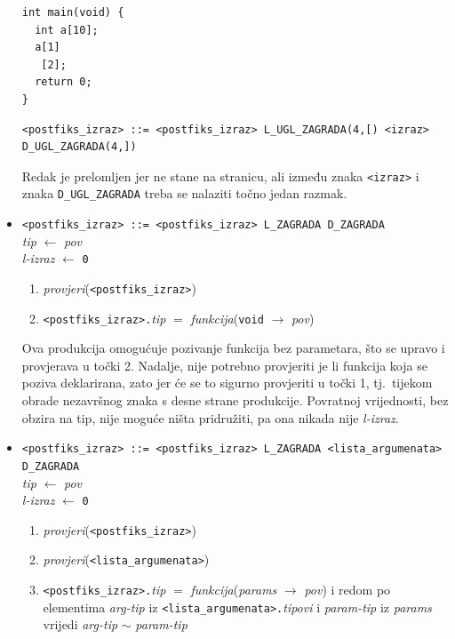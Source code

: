 \documentclass[times, 12pt, utf8]{book}
\begin{document}
\begin{itemize}
\begin{lstlisting}[caption={Program sa semantičkom pogreškom višestrukog indeksiranja niza.},label=lst:primjer_dvostruko_indeksiranje_in]
int main(void) {
  int a[10];
  a[1]
   [2];
  return 0;
}
\end{lstlisting}

\begin{lstlisting}[caption={Ispis semantičkog analizatora za generativno stablo programa \ref{lst:primjer_dvostruko_indeksiranje_in}.},label=lst:primjer_dvostruko_indeksiranje_out]
<postfiks_izraz> ::= <postfiks_izraz> L_UGL_ZAGRADA(4,[) <izraz> D_UGL_ZAGRADA(4,])

\end{lstlisting}

Redak je prelomljen jer ne stane na stranicu, ali između znaka \verb|<izraz>| i znaka \verb|D_UGL_ZAGRADA| treba se nalaziti točno jedan razmak.

\item
\verb|<postfiks_izraz> ::= <postfiks_izraz> L_ZAGRADA D_ZAGRADA|\\
\emph{tip} \(\leftarrow\) \emph{pov}\\
\emph{l-izraz} \(\leftarrow\) \verb|0|
\begin{enumerate}
\item
\emph{provjeri}(\verb|<postfiks_izraz>|)
\item
\verb|<postfiks_izraz>.|\emph{tip} \(=\) \emph{funkcija}(\verb|void| \(\to\) \emph{pov})
\end{enumerate}

Ova produkcija omogućuje pozivanje funkcija bez parametara, što se upravo i provjerava u točki 2.
Nadalje, nije potrebno provjeriti je li funkcija koja se poziva deklarirana, zato jer će se to sigurno provjeriti u točki 1, tj.~tijekom obrade nezavršnog znaka s desne strane produkcije.
Povratnoj vrijednosti, bez obzira na tip, nije moguće ništa pridružiti, pa ona nikada nije \emph{l-izraz}.

\item
\verb|<postfiks_izraz> ::= <postfiks_izraz> L_ZAGRADA <lista_argumenata> D_ZAGRADA|\\
\emph{tip} \(\leftarrow\) \emph{pov}\\
\emph{l-izraz} \(\leftarrow\) \verb|0|
\begin{enumerate}
\item
\emph{provjeri}(\verb|<postfiks_izraz>|)
\item
\emph{provjeri}(\verb|<lista_argumenata>|)
\item
\verb|<postfiks_izraz>.|\emph{tip} \(=\) \emph{funkcija}(\emph{params} \(\to\) \emph{pov}) i redom po elementima \emph{arg-tip} iz \verb|<lista_argumenata>.|\emph{tipovi} i \emph{param-tip} iz \emph{params} vrijedi \emph{arg-tip} \(\sim\) \emph{param-tip}
\end{enumerate}


\end{itemize}
\end{document}
